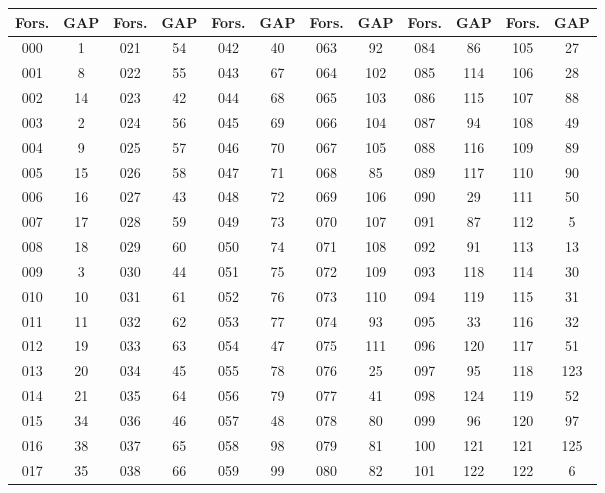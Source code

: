\documentclass{article}
\theoremstyle{plain}
\theoremstyle{definition}
\begin{document}
\begin{table}[h!]
\begin{center}
\begin{tabular}{cc|cc|cc|cc|cc|cc}
Fors. & GAP & Fors. & GAP & Fors. & GAP & Fors. & GAP & Fors. & GAP & Fors. & GAP\\
\hline
000 & 1  & 021 & 54 & 042 & 40  & 063 & 92  & 084  & 86  & 105 & 27  \\
001 & 8  & 022 & 55 & 043 & 67  & 064 & 102 & 085  & 114 & 106 & 28  \\
002 & 14 & 023 & 42 & 044 & 68  & 065 & 103 & 086  & 115 & 107 & 88  \\
003 & 2  & 024 & 56 & 045 & 69  & 066 & 104 & 087  & 94  & 108 & 49  \\
004 & 9  & 025 & 57 & 046 & 70  & 067 & 105 & 088  & 116 & 109 & 89  \\
005 & 15 & 026 & 58 & 047 & 71  & 068 & 85  & 089  & 117 & 110 & 90  \\
006 & 16 & 027 & 43 & 048 & 72  & 069 & 106 & 090  & 29  & 111 & 50  \\
007 & 17 & 028 & 59 & 049 & 73  & 070 & 107 & 091  & 87  & 112 & 5   \\
008 & 18 & 029 & 60 & 050 & 74  & 071 & 108 & 092  & 91  & 113 & 13  \\
009 & 3  & 030 & 44 & 051 & 75  & 072 & 109 & 093  & 118 & 114 & 30  \\
010 & 10 & 031 & 61 & 052 & 76  & 073 & 110 & 094  & 119 & 115 & 31  \\
011 & 11 & 032 & 62 & 053 & 77  & 074 & 93  & 095  & 33  & 116 & 32  \\
012 & 19 & 033 & 63 & 054 & 47  & 075 & 111 & 096  & 120 & 117 & 51  \\
013 & 20 & 034 & 45 & 055 & 78  & 076 & 25  & 097  & 95  & 118 & 123 \\
014 & 21 & 035 & 64 & 056 & 79  & 077 & 41  & 098  & 124 & 119 & 52  \\
015 & 34 & 036 & 46 & 057 & 48  & 078 & 80  & 099  & 96  & 120 & 97  \\
016 & 38 & 037 & 65 & 058 & 98  & 079 & 81  & 100 & 121 & 121 & 125 \\
017 & 35 & 038 & 66 & 059 & 99  & 080 & 82  & 101 & 122 & 122 & 6   \\

\end{tabular}
\end{center}
\end{table}
\end{document}
